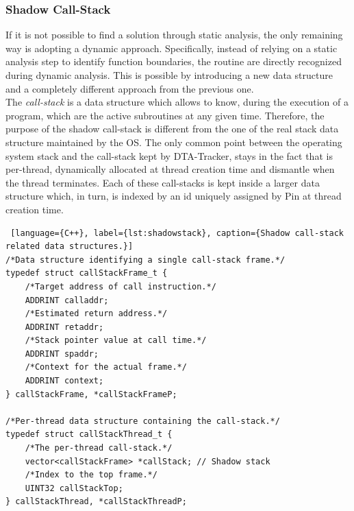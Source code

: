 \documentclass[LaM,binding=0.6cm]{sapthesis}
\begin{document}
\subsubsection{Shadow Call-Stack}
If it is not possible to find a solution through static analysis, the only remaining way is adopting a dynamic approach. Specifically, instead of relying on a static analysis step to identify function boundaries, the routine are directly recognized during dynamic analysis. This is possible by introducing a new data structure and a completely different approach from the previous one.\\

The \textit{call-stack} is a data structure which allows to know, during the execution of a program, which are the active subroutines at any given time\cite{de2018now}. Therefore, the purpose of the shadow call-stack is different from the one of the real stack data structure maintained by the OS. The only common point between the operating system stack and the call-stack kept by DTA-Tracker, stays in the fact that is per-thread, dynamically allocated at thread creation time and dismantle when the thread terminates. Each of these call-stacks is kept inside a larger data structure which, in turn, is indexed by an id uniquely assigned by Pin at thread creation time.

\begin{lstlisting} [language={C++}, label={lst:shadowstack}, caption={Shadow call-stack related data structures.}]
/*Data structure identifying a single call-stack frame.*/
typedef struct callStackFrame_t {
	/*Target address of call instruction.*/
	ADDRINT calladdr; 
	/*Estimated return address.*/
	ADDRINT retaddr;
	/*Stack pointer value at call time.*/
	ADDRINT spaddr;
	/*Context for the actual frame.*/
	ADDRINT context;
} callStackFrame, *callStackFrameP;

/*Per-thread data structure containing the call-stack.*/
typedef struct callStackThread_t {
	/*The per-thread call-stack.*/
	vector<callStackFrame> *callStack; // Shadow stack
	/*Index to the top frame.*/
	UINT32 callStackTop;
} callStackThread, *callStackThreadP;
\end{lstlisting}
\end{document}
